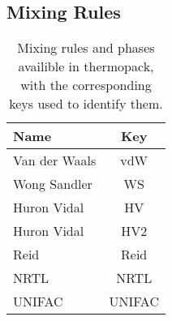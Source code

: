 \documentclass[english]{../thermomemo/thermomemo}
\begin{document}
\subsection{Mixing Rules}
\begin{table}[ht!]
  \centering
  \begin{tabular}{l c}
    \toprule
    Name & Key \\
    \midrule
    Van der Waals & vdW\\
    Wong Sandler & WS \\
    Huron Vidal & HV \\
    Huron Vidal & HV2 \\
    Reid & Reid \\
    NRTL & NRTL \\
    UNIFAC & UNIFAC \\
    \bottomrule
  \end{tabular}
  \caption{Mixing rules and phases availible in thermopack, with the corresponding keys used to identify them.}
  \label{tab:mixing_rules_thermopack}
\end{table}
\end{document}
